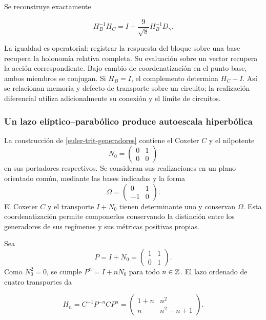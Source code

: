 Se reconstruye exactamente



\begin{equation}
\boxed{H_B^{-1}H_C=I+\frac9{\sqrt8}H_B^{-1}D_\gamma.}
\label{nuc11:eq:25}
\end{equation}



La igualdad es operatorial: registrar la respuesta del bloque
sobre una base recupera la holonomía relativa completa.
Su evaluación sobre un vector recupera la acción correspondiente.
Bajo cambio de coordenatización en el punto base, ambos miembros se conjugan.
Si \(H_B=I\), el complemento determina \(H_C-I\).
Así se relacionan memoria y defecto de transporte sobre un
circuito; la realización diferencial utiliza adicionalmente
su conexión y el límite de circuitos.

\subsubsection{Un lazo elíptico–parabólico produce autoescala hiperbólica}

La construcción de \cref{euler-trit-generadores} contiene el
Coxeter \(C\) y el nilpotente
\[
 N_0=\begin{pmatrix}0&1\\0&0\end{pmatrix}
\]
en sus portadores respectivos.
Se consideran sus realizaciones en un plano orientado común,
mediante las bases indicadas y la forma
\[
 \Omega=\begin{pmatrix}0&1\\-1&0\end{pmatrix}.
\]
El Coxeter \(C\) y el transporte \(I+N_0\) tienen determinante
uno y conservan \(\Omega\).
Esta coordenatización permite componerlos conservando la distinción entre
los generadores de sus regímenes y sus métricas positivas propias.

Sea
\[
 P=I+N_0=\begin{pmatrix}1&1\\0&1\end{pmatrix}.
\]
Como \(N_0^2=0\), se cumple \(P^n=I+nN_0\) para todo
\(n\in\mathbb Z\).
El lazo ordenado de cuatro transportes da



\begin{equation}
H_n=C^{-1}P^{-n}CP^n
=\begin{pmatrix}1+n&n^2\\n&n^2-n+1\end{pmatrix}.
\label{nuc11:eq:28}
\end{equation}



